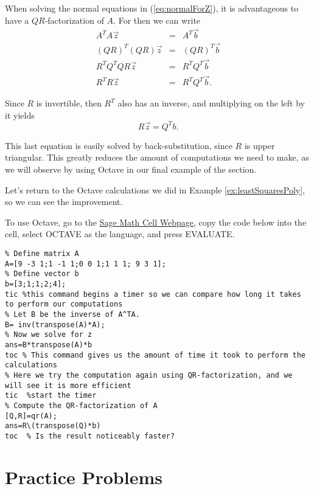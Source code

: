 \documentclass{ximera}
\begin{document}
When solving the normal equations in (\ref{eq:normalForZ}), it is advantageous to have a $QR$-factorization of $A$.  For then we can write
\begin{eqnarray*}
A^TA\vec{z}&=&A^T\vec{b} \\
(QR)^T(QR)\vec{z}&=&(QR)^T\vec{b} \\
R^TQ^TQR\vec{z}&=&R^TQ^T\vec{b} \\
R^TR\vec{z}&=&R^TQ^T\vec{b}.
\end{eqnarray*}

Since $R$ is invertible, then $R^T$ also has an inverse, and multiplying on the left by it yields
$$R\vec{z} = Q^T b.$$

This last equation is easily solved by back-substitution, since $R$ is upper triangular.
This greatly reduces the amount of computations we need to make, as we will observe by using Octave in our final example of the section.  

\begin{example}\label{ex:leastSquaresPolyRevisited}
Let's return to the Octave calculations we did in Example \ref{ex:leastSquaresPoly}, so we can see the improvement.

\begin{explanation}
    To use Octave, go to the \href{https://sagecell.sagemath.org/}{Sage Math Cell Webpage}, copy the code below into the cell, select OCTAVE as the language, and press EVALUATE.

\begin{verbatim}
% Define matrix A
A=[9 -3 1;1 -1 1;0 0 1;1 1 1; 9 3 1];
% Define vector b
b=[3;1;1;2;4];
tic %this command begins a timer so we can compare how long it takes to perform our computations
% Let B be the inverse of A^TA.  
B= inv(transpose(A)*A);
% Now we solve for z
ans=B*transpose(A)*b
toc % This command gives us the amount of time it took to perform the calculations
% Here we try the computation again using QR-factorization, and we will see it is more efficient
tic  %start the timer
% Compute the QR-factorization of A  
[Q,R]=qr(A);
ans=R\(transpose(Q)*b)
toc  % Is the result noticeably faster?
\end{verbatim}

\end{explanation}

\end{example}

\section*{Practice Problems}
\end{document}
